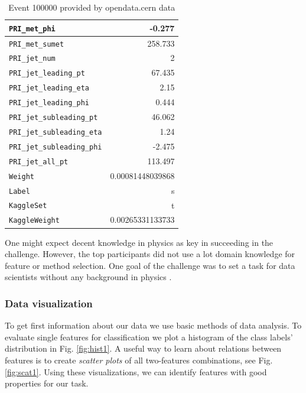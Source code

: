 \begin{table}
\begin{center}
\begin{tabular}{|l|r|}
		\hline
		\texttt{PRI\_met\_phi} & -0.277 \\
		\hline
		\texttt{PRI\_met\_sumet} & 258.733 \\
		\hline
		\texttt{PRI\_jet\_num} & 2 \\
		\hline
		\texttt{PRI\_jet\_leading\_pt} & 67.435 \\
		\hline
		\texttt{PRI\_jet\_leading\_eta} & 2.15 \\
		\hline
		\texttt{PRI\_jet\_leading\_phi} & 0.444 \\
		\hline
		\texttt{PRI\_jet\_subleading\_pt} & 46.062 \\
		\hline
		\texttt{PRI\_jet\_subleading\_eta} & 1.24 \\
		\hline
		\texttt{PRI\_jet\_subleading\_phi} & -2.475 \\
		\hline
		\texttt{PRI\_jet\_all\_pt} & 113.497 \\
		\hline
		\texttt{Weight} & 0.00081448039868 \\
		\hline
		\texttt{Label} & s \\
		\hline
		\texttt{KaggleSet} & t \\
		\hline
		\texttt{KaggleWeight} & 0.00265331133733 \\
		\hline	
	\end{tabular}
\end{center}
\caption{Event 100000 provided by opendata.cern data \cite{higgsData}}
\label{tab:data}
\end{table}

One might expect decent knowledge in physics as key in succeeding in the challenge. However, the top participants did not use a lot domain knowledge for feature or method selection. One goal of the challenge was to set a task for data scientists without any background in physics \cite{higgsPaper}.

\subsubsection{Data visualization}
To get first information about our data we use basic methods of data analysis.
To evaluate single features for classification we plot a histogram of the class labels' distribution in Fig. \ref{fig:hist1}. A useful way to learn about relations between features is to create \emph{scatter plots} of all two-features combinations, see Fig. \ref{fig:scat1}.
Using these visualizations, we can identify features with good properties for our task.


